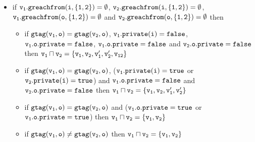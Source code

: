 \begin{itemize}
 
  \item if $\tt \mathtt{v}_1.greachfrom(i,\{1,2\}) = \emptyset$, $\tt \mathtt{v}_2.greachfrom(i,\{1,2\}) = \emptyset$, $\tt \mathtt{v}_1.greachfrom(o,\{1,2\}) = \emptyset$ and $\tt \mathtt{v}_2.greachfrom(o,\{1,2\}) = \emptyset$ then 
 \begin{itemize}
 
 
 \item if $\tt gtag(\mathtt{v}_1, o) = gtag(\mathtt{v}_2, o)$, $\tt \mathtt{v}_1.private(i) = false$, $\tt \mathtt{v}_1.\mathtt{o}.\mathtt{private} = false$, $\tt \mathtt{v}_1.\mathtt{o}.\mathtt{private} = false$ and $\tt \mathtt{v}_2.\mathtt{o}.\mathtt{private} = false$ then  $\tt \mathtt{v}_1 \sqcap \mathtt{v}_2 = \{\mathtt{v}_1,\mathtt{v}_2,\mathtt{v}_1',\mathtt{v}_2',\mathtt{v}_{12}\}$ %
    \item if $\tt gtag(\mathtt{v}_1, o) = gtag(\mathtt{v}_2, o)$, ($\tt \mathtt{v}_1.private(i) = true$ or $\tt \mathtt{v}_2.private(i) = true$) and $\tt \mathtt{v}_1.\mathtt{o}.\mathtt{private} = false$ and $\tt \mathtt{v}_2.\mathtt{o}.\mathtt{private} = false$ then  $\tt \mathtt{v}_1 \sqcap \mathtt{v}_2 = \{\mathtt{v}_1,\mathtt{v}_2,\mathtt{v}_1',\mathtt{v}_2'\}$  

  \item if $\tt gtag(\mathtt{v}_1, o) = gtag(\mathtt{v}_2, o)$ and ($\tt \mathtt{v}_1.\mathtt{o}.\mathtt{private} = true$ or $\tt \mathtt{v}_1.\mathtt{o}.\mathtt{private} = true$) then  $\tt \mathtt{v}_1 \sqcap \mathtt{v}_2 = \{\mathtt{v}_1,\mathtt{v}_2\}$ 

    \item if $\tt gtag(\mathtt{v}_1, o) \neq gtag(\mathtt{v}_2, o)$ then $\tt \mathtt{v}_1 \sqcap \mathtt{v}_2 = \{\mathtt{v}_1,\mathtt{v}_2\}$
 \end{itemize}
 
 \end{itemize}



%
